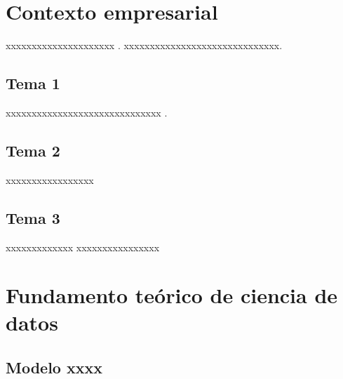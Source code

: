 

\section{Contexto empresarial}
\label{sec:Contexto-empresarial}

xxxxxxxxxxxxxxxxxxxxx \cite{Keiningham2011}. xxxxxxxxxxxxxxxxxxxxxxxxxxxxxx.


    \subsection{Tema 1}
    xxxxxxxxxxxxxxxxxxxxxxxxxxxxxx \cite{glady2009predicting, du2007size}.
        
    \subsection{Tema 2}
    xxxxxxxxxxxxxxxxx   \cite{Winkelmann1993PoissonLogisticRegression}
    
    \subsection{Tema 3}
    xxxxxxxxxxxxx \cite{glady2009predicting}xxxxxxxxxxxxxxxx
    
    
    

\section{Fundamento teórico de ciencia de datos}
\label{sec:Fundamento-teorico}

    \subsection{Modelo xxxx}

